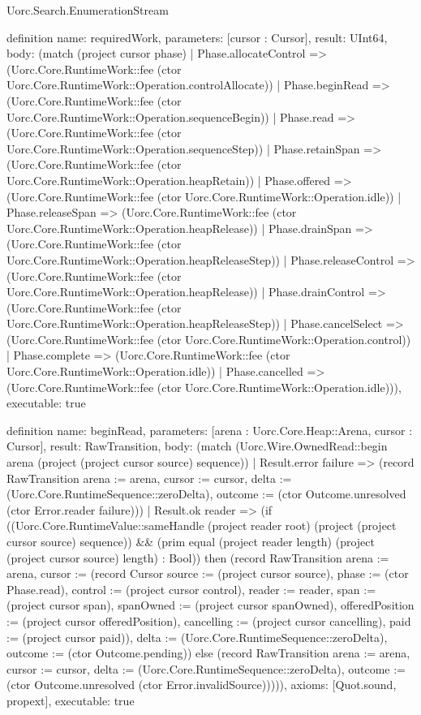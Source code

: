 \begin{lexlean}{Uorc.Search.EnumerationStream}
\begin{semanticmodule}
definition{
  name: requiredWork,
  parameters: [cursor : Cursor],
  result: UInt64,
  body: (match (project cursor phase)
    | Phase.allocateControl => (Uorc.Core.RuntimeWork::fee (ctor Uorc.Core.RuntimeWork::Operation.controlAllocate))
    | Phase.beginRead => (Uorc.Core.RuntimeWork::fee (ctor Uorc.Core.RuntimeWork::Operation.sequenceBegin))
    | Phase.read => (Uorc.Core.RuntimeWork::fee (ctor Uorc.Core.RuntimeWork::Operation.sequenceStep))
    | Phase.retainSpan => (Uorc.Core.RuntimeWork::fee (ctor Uorc.Core.RuntimeWork::Operation.heapRetain))
    | Phase.offered => (Uorc.Core.RuntimeWork::fee (ctor Uorc.Core.RuntimeWork::Operation.idle))
    | Phase.releaseSpan => (Uorc.Core.RuntimeWork::fee (ctor Uorc.Core.RuntimeWork::Operation.heapRelease))
    | Phase.drainSpan => (Uorc.Core.RuntimeWork::fee (ctor Uorc.Core.RuntimeWork::Operation.heapReleaseStep))
    | Phase.releaseControl => (Uorc.Core.RuntimeWork::fee (ctor Uorc.Core.RuntimeWork::Operation.heapRelease))
    | Phase.drainControl => (Uorc.Core.RuntimeWork::fee (ctor Uorc.Core.RuntimeWork::Operation.heapReleaseStep))
    | Phase.cancelSelect => (Uorc.Core.RuntimeWork::fee (ctor Uorc.Core.RuntimeWork::Operation.control))
    | Phase.complete => (Uorc.Core.RuntimeWork::fee (ctor Uorc.Core.RuntimeWork::Operation.idle))
    | Phase.cancelled => (Uorc.Core.RuntimeWork::fee (ctor Uorc.Core.RuntimeWork::Operation.idle))),
  executable: true
}

definition{
  name: beginRead,
  parameters: [arena : Uorc.Core.Heap::Arena, cursor : Cursor],
  result: RawTransition,
  body: (match (Uorc.Wire.OwnedRead::begin arena (project (project cursor source) sequence))
    | Result.error failure => (record RawTransition {arena := arena, cursor := cursor, delta := (Uorc.Core.RuntimeSequence::zeroDelta), outcome := (ctor Outcome.unresolved (ctor Error.reader failure))})
    | Result.ok reader => (if ((Uorc.Core.RuntimeValue::sameHandle (project reader root) (project (project cursor source) sequence)) && (prim equal (project reader length) (project (project cursor source) length) : Bool)) then (record RawTransition {arena := arena, cursor := (record Cursor {source := (project cursor source), phase := (ctor Phase.read), control := (project cursor control), reader := reader, span := (project cursor span), spanOwned := (project cursor spanOwned), offeredPosition := (project cursor offeredPosition), cancelling := (project cursor cancelling), paid := (project cursor paid)}), delta := (Uorc.Core.RuntimeSequence::zeroDelta), outcome := (ctor Outcome.pending)}) else (record RawTransition {arena := arena, cursor := cursor, delta := (Uorc.Core.RuntimeSequence::zeroDelta), outcome := (ctor Outcome.unresolved (ctor Error.invalidSource))}))),
  axioms: [Quot.sound, propext],
  executable: true
}


\end{semanticmodule}
\end{lexlean}
